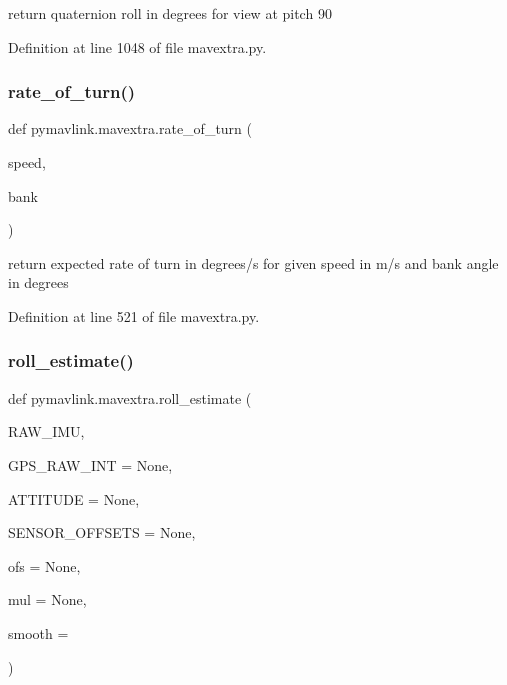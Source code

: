 \begin{DoxyVerb}return quaternion roll in degrees for view at pitch 90\end{DoxyVerb}
 

Definition at line 1048 of file mavextra.\+py.

\mbox{\label{namespacepymavlink_1_1mavextra_a4d7617fb1541d638db0023fd663c59fd}} 
\subsubsection{\texorpdfstring{rate\_of\_turn()}{rate\_of\_turn()}}
{\footnotesize\ttfamily def pymavlink.\+mavextra.\+rate\+\_\+of\+\_\+turn (\begin{DoxyParamCaption}\item[{}]{speed,  }\item[{}]{bank }\end{DoxyParamCaption})}

\begin{DoxyVerb}return expected rate of turn in degrees/s for given speed in m/s and
   bank angle in degrees\end{DoxyVerb}
 

Definition at line 521 of file mavextra.\+py.

\mbox{\label{namespacepymavlink_1_1mavextra_a1a001cccb29771aea954d733377c92f9}} 
\subsubsection{\texorpdfstring{roll\_estimate()}{roll\_estimate()}}
{\footnotesize\ttfamily def pymavlink.\+mavextra.\+roll\+\_\+estimate (\begin{DoxyParamCaption}\item[{}]{R\+A\+W\+\_\+\+I\+MU,  }\item[{}]{G\+P\+S\+\_\+\+R\+A\+W\+\_\+\+I\+NT = {\ttfamily None},  }\item[{}]{A\+T\+T\+I\+T\+U\+DE = {\ttfamily None},  }\item[{}]{S\+E\+N\+S\+O\+R\+\_\+\+O\+F\+F\+S\+E\+TS = {\ttfamily None},  }\item[{}]{ofs = {\ttfamily None},  }\item[{}]{mul = {\ttfamily None},  }\item[{}]{smooth = {} }\end{DoxyParamCaption})}

